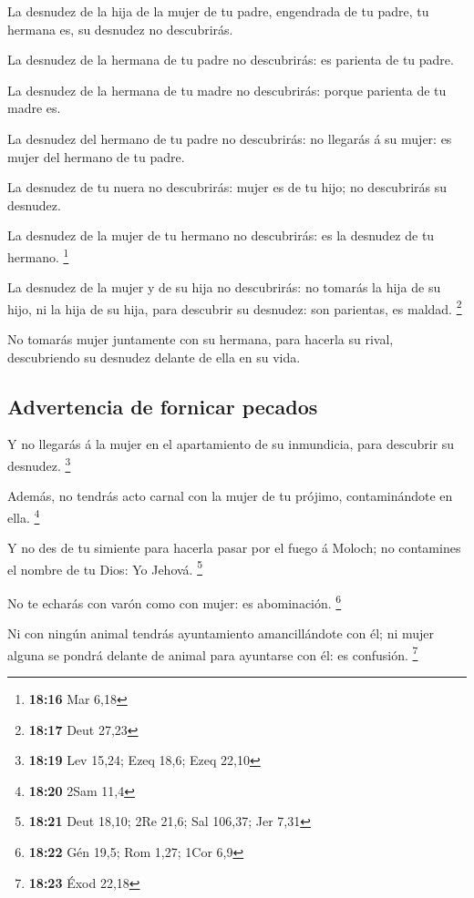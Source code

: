  La desnudez de la hija de la mujer de tu padre, engendrada
de tu padre, tu hermana es, su desnudez no descubrirás.

 La desnudez de la hermana de tu padre no descubrirás: es
parienta de tu padre.

 La desnudez de la hermana de tu madre no descubrirás:
porque parienta de tu madre es.

 La desnudez del hermano de tu padre no descubrirás: no
llegarás á su mujer: es mujer del hermano de tu padre.

 La desnudez de tu nuera no descubrirás: mujer es de tu
hijo; no descubrirás su desnudez.

 La desnudez de la mujer de tu hermano no descubrirás: es
la desnudez de tu hermano. \footnote{\textbf{18:16} Mar 6,18}

 La desnudez de la mujer y de su hija no descubrirás: no
tomarás la hija de su hijo, ni la hija de su hija, para descubrir su
desnudez: son parientas, es maldad. \footnote{\textbf{18:17} Deut 27,23}

 No tomarás mujer juntamente con su hermana, para hacerla
su rival, descubriendo su desnudez delante de ella en su vida.

\hypertarget{advertencia-de-fornicar-pecados}{%
\subsection{Advertencia de fornicar
pecados}\label{advertencia-de-fornicar-pecados}}

 Y no llegarás á la mujer en el apartamiento de su
inmundicia, para descubrir su desnudez. \footnote{\textbf{18:19} Lev
  15,24; Ezeq 18,6; Ezeq 22,10}

 Además, no tendrás acto carnal con la mujer de tu prójimo,
contaminándote en ella. \footnote{\textbf{18:20} 2Sam 11,4}

 Y no des de tu simiente para hacerla pasar por el fuego á
Moloch; no contamines el nombre de tu Dios: Yo Jehová. \footnote{\textbf{18:21}
  Deut 18,10; 2Re 21,6; Sal 106,37; Jer 7,31}

 No te echarás con varón como con mujer: es abominación.
\footnote{\textbf{18:22} Gén 19,5; Rom 1,27; 1Cor 6,9}

 Ni con ningún animal tendrás ayuntamiento amancillándote
con él; ni mujer alguna se pondrá delante de animal para ayuntarse con
él: es confusión. \footnote{\textbf{18:23} Éxod 22,18}

